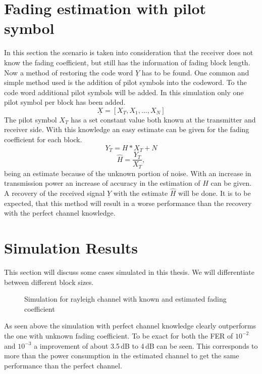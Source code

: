 \section{Fading estimation with pilot symbol}
In this section the scenario is taken into consideration that the receiver does not know the fading coefficient, but still has the information of fading block length. Now a method of restoring the code word \textbf{$\underline{Y}$} has to be found.
\newline
One common and simple method used is the addition of pilot symbols into the codeword. To the code word additional pilot symbols will be added. In this simulation only one pilot symbol per block has been added. 
\begin{equation}
\underline{X} = [X_T, X_1, ..., X_N]
\end{equation}
The pilot symbol $X_T$ has a set constant value both known at the transmitter and receiver side. With this knowledge an easy estimate can be given for the fading coefficient for each block.
\begin{equation}
Y_T = H * X_T + N
\end{equation}
\begin{equation}
\hat{H} = \frac{Y_T}{X_T},
\end{equation}
being an estimate because of the unknown portion of noise. With an increase in transmission power an increase of accuracy in the estimation of $H$ can be given.
A recovery of the received signal \textbf{$\underline{Y}$} with the estimate \textbf{$\hat{H}$} will be done. It is to be expected, that this method will result in a worse performance than the recovery with the perfect channel knowledge. 

\section{Simulation Results}
This section will discuss some cases simulated in this thesis. We will differentiate between different block sizes.
\begin{figure}[!htb]
	\setlength{}
	\setlength\fheight{0.4\textheight}
	\centering
		
	\caption{Simulation for rayleigh channel with known and estimated fading coefficient}
	\label{fig:rayferfirst}
\end{figure}

As seen above the simulation with perfect channel knowledge clearly outperforms the one with unknown fading coefficient. To be exact for both the \gls{FER} of $10^{-2}$ and $10^{-3}$ a improvement of about 3.5\,dB to 4\,dB can be seen. This corresponds to more than the power consumption in the estimated channel to get the same performance than the perfect channel.

